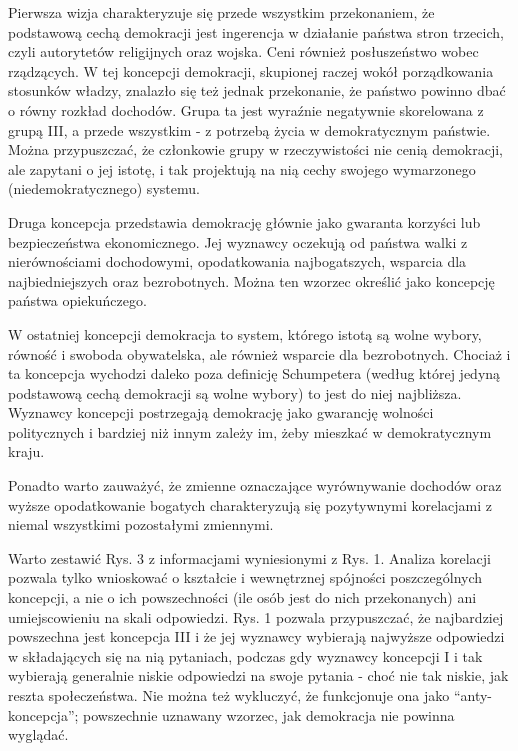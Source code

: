 \documentclass[12pt]{article}
\begin{document}
Pierwsza wizja charakteryzuje się przede wszystkim przekonaniem, że podstawową cechą demokracji jest ingerencja w działanie państwa stron trzecich, czyli autorytetów religijnych oraz wojska. Ceni również posłuszeństwo wobec rządzących. W tej koncepcji demokracji, skupionej raczej wokół porządkowania stosunków władzy, znalazło się też jednak przekonanie, że państwo powinno dbać o równy rozkład dochodów. Grupa ta jest wyraźnie negatywnie skorelowana z grupą III, a przede wszystkim - z potrzebą życia w demokratycznym państwie. Można przypuszczać, że członkowie grupy w rzeczywistości nie cenią demokracji, ale zapytani o jej istotę, i tak projektują na nią cechy swojego wymarzonego (niedemokratycznego) systemu.

Druga koncepcja przedstawia demokrację głównie jako gwaranta korzyści lub bezpieczeństwa ekonomicznego. Jej wyznawcy oczekują od państwa walki z nierównościami dochodowymi, opodatkowania najbogatszych, wsparcia dla najbiedniejszych oraz bezrobotnych. Można ten wzorzec określić jako koncepcję państwa opiekuńczego.

W ostatniej koncepcji demokracja to system, którego istotą są wolne wybory, równość i swoboda obywatelska, ale również wsparcie dla bezrobotnych. Chociaż i ta koncepcja wychodzi daleko poza definicję Schumpetera (według której jedyną podstawową cechą demokracji są wolne wybory) to jest do niej najbliższa. Wyznawcy koncepcji postrzegają demokrację jako gwarancję wolności politycznych i bardziej niż innym zależy im, żeby mieszkać w demokratycznym kraju.

Ponadto warto zauważyć, że zmienne oznaczające wyrównywanie dochodów oraz wyższe opodatkowanie bogatych charakteryzują się pozytywnymi korelacjami z niemal wszystkimi pozostałymi zmiennymi.

Warto zestawić Rys. 3 z informacjami wyniesionymi z Rys. 1. Analiza korelacji pozwala tylko wnioskować o kształcie i wewnętrznej spójności poszczególnych koncepcji, a nie o ich powszechności (ile osób jest do nich przekonanych) ani umiejscowieniu na skali odpowiedzi. Rys. 1 pozwala przypuszczać, że najbardziej powszechna jest koncepcja III i że jej wyznawcy wybierają najwyższe odpowiedzi w składających się na nią pytaniach, podczas gdy wyznawcy koncepcji I i tak wybierają generalnie niskie odpowiedzi na swoje pytania - choć nie tak niskie, jak reszta społeczeństwa. Nie można też wykluczyć, że funkcjonuje ona jako ``anty-koncepcja''; powszechnie uznawany wzorzec, jak demokracja nie powinna wyglądać.
\end{document}
